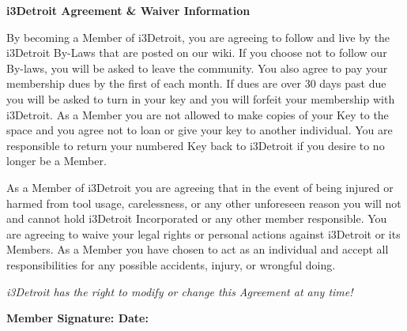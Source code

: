 \documentclass[10pt,letterpaper]{article}
\begin{document}
\tiny
\begin{mdframed}
    \textbf{i3Detroit Agreement \& Waiver Information}

    By becoming a Member of i3Detroit, you are agreeing to follow and live by the i3Detroit By-Laws that are posted on our wiki. If you choose not to follow our By-laws, you will be asked to leave the community. You also agree to pay your membership dues by the first of each month. If dues are over 30 days past due you will be asked to turn in your key and you will forfeit your membership with i3Detroit. As a Member you are not allowed to make copies of your Key to the space and you agree not to loan or give your key to another individual. You are responsible to return your numbered Key back to i3Detroit if you desire to no longer be a Member.

    As a Member of i3Detroit you are agreeing that in the event of being injured or harmed from tool usage, carelessness, or any other unforeseen reason you will not and cannot hold i3Detroit Incorporated or any other member responsible. You are agreeing to waive your legal rights or personal actions against i3Detroit or its Members. As a Member you have chosen to act as an individual and accept all responsibilities for any possible accidents, injury, or wrongful doing.
    
    \textit{i3Detroit has the right to modify or change this Agreement at any time!}

\end{mdframed}

\begin{Form}
    \textbf{Member Signature: \TextField[name=regsig,width=8cm,bordercolor=black]{\mbox{}} Date: \TextField[name=regsigdate,width=3cm,bordercolor=black]{\mbox{}}}
\end{Form}
\end{document}
